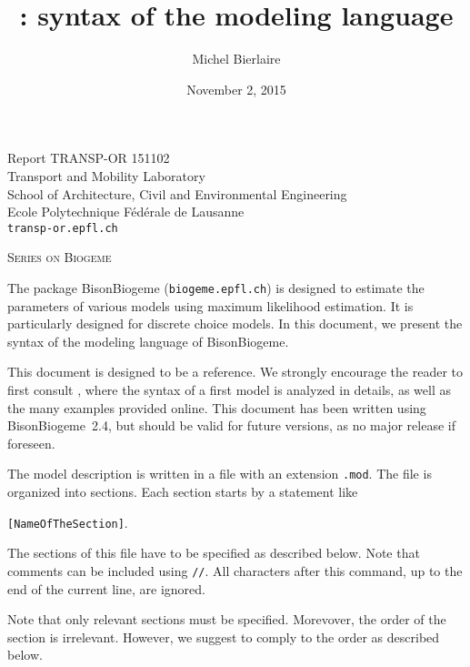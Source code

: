 \documentclass[12pt,a4paper]{article}
\title{\BBIOGEME: syntax of the modeling language}
\author{Michel Bierlaire}
\date{November 2, 2015}
\newcommand{\BBIOGEME}{BisonBiogeme}
\begin{document}
\begin{titlepage}
\pagestyle{empty}

\maketitle
\vspace{2cm}

\begin{center}
\small Report TRANSP-OR 151102 \\ Transport and Mobility Laboratory \\ School of Architecture, Civil and Environmental Engineering \\ Ecole Polytechnique F\'ed\'erale de Lausanne \\ \verb+transp-or.epfl.ch+
\begin{center}
\textsc{Series on Biogeme}
\end{center}
\end{center}


\clearpage
\end{titlepage}

The package BisonBiogeme (\texttt{biogeme.epfl.ch}) is designed to estimate the parameters of
various models using maximum likelihood estimation. It is particularly
designed for discrete choice models. In this document, we present the
syntax of the modeling language of \BBIOGEME.

This document is designed to be a reference. We strongly encourage the reader to first consult
, where the syntax of a first model is
analyzed in details, as well as the many examples provided online. This document has been written using
\BBIOGEME\ 2.4,  but should be valid for future versions, as no major
release if foreseen. 

The model description is written in a file with an extension
\texttt{.mod}. The file is organized into sections. Each section
starts by a statement like
\begin{center}
 \verb+[NameOfTheSection]+. 
\end{center}
The sections of this file have to be specified as described below.
Note that comments can be included using \verb+//+. All characters
after this command, up to the end of the current line, are ignored.

Note that only relevant sections must be specified. Morevover, the
order of the section is irrelevant. However, we suggest to comply to
the order as described below. 
\end{document}
